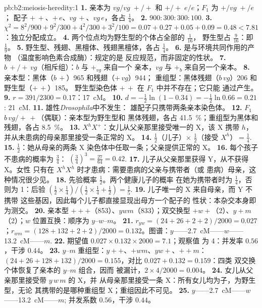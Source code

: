 \begin{solution}{pb:b2:meiosis-heredity:1}
\textbf{1.} 亲本为 $vg/vg\;+/+$ 和 $+/+\;e/e$；$F_1$ 为 $+/vg\;+/e$；
配子 $+\,+$、$+\,e$、$vg\,+$、$vg\,e$，各占 $\tfrac14$。
\textbf{2.} $900 : 300 : 300 : 100$.
\textbf{3.} $\chi^2 = 8^2/900 + 9^2/300 + 4^2/300 + 3^2/100 = 0.07 +
0.27 + 0.05 + 0.09 = 0.48 < 7.81$：独立分配成立。
\textbf{4.} 两个位点均为野生型的个体占全部的 $\tfrac{1}{16}$，
野生型占 $\tfrac{9}{16}$：即 $\tfrac19$。
\textbf{5.} 野生型、残翅、黑檀体、残翅黑檀体，各占 $\tfrac14$。
\textbf{6.} 是与环境共同作用的产物
（温度影响色素合成酶）：规定的是
反应规范，而非固定的性状。
\textbf{7.} $b\,+/+\,vg$（相斥组）：$b$ 与 $+_{vg}$ 来自一个
亲本，$vg$ 与 $+_b$ 来自另一个亲本。
\textbf{8.} 亲本型：黑体（$b\,+$）965 和残翅（$+\,vg$）944；
重组型：黑体残翅（$b\,vg$）206 和野生型（$+\,+$）185。
野生型染色体 $+\,+$ 在 $F_1$ 中并不存在；它只能
通过产生。
\textbf{9.} $r = 391/2300 = 0.17$：\qty{17}{cM}。
\textbf{10.} $d = -\tfrac12\ln(1 - 0.34) = -\tfrac12\ln 0.66 = 0.21$:
\qty{21}{cM}.
\textbf{11.} 雄性\emph{Drosophila}中不发生：
雄配子只携带两条亲本染色体。
\textbf{12.} $F_1$ $b\,vg/+\,+$（偶联）：亲本型为野生型和
黑体残翅，各占 \qty{41.5}{\%}；重组型为黑体和
残翅，各占 \qty{8.5}{\%}。
\textbf{13.} $X^hX^+$：女儿从父亲那里接受唯一的 X，该 X
携带 $h$，并从未患病的母亲那里接受一条正常的 X。
\textbf{14.} $\tfrac12$（儿子）$\times$ $\tfrac12$（接受 $X^h$）$=
\tfrac14$.
\textbf{15.} $\tfrac12$：她从母亲的两条 X
染色体中任取一条；父亲提供正常的 X。
\textbf{16.} 每个孩子不患病的概率为 $\tfrac34$：
$(\tfrac34)^3 = \tfrac{27}{64} = 0.42$.
\textbf{17.} 儿子从父亲那里获得 Y，从不获得 X。女性
只有在 $X^hX^h$ 时才患病：需要患病的父亲与携带者（或
患病）母亲，这种情况很少见。
\textbf{18.} 先验概率 $\tfrac12$。两个健康儿子的概率
在她为携带者时为 $\tfrac14$，否则为 1：后验 $(\tfrac12\times
\tfrac14)/(\tfrac12\times\tfrac14 + \tfrac12) = \tfrac15$.
\textbf{19.} 儿子唯一的 X 来自母亲，而 Y 不携带
这些基因，因此每个儿子都直接显现出母方一个配子的
性状：本杂交本身即为测交。
\textbf{20.} 亲本型 $+++$（853）、$ywm$（833）；双交换型
$+w+$（2）、$y+m$（2）；$w$ 位置互换：顺序为 $y$--$w$--$m$。
\textbf{21.} $r_{yw} = (24 + 26 + 2 + 2)/2000 = 0.027$；$r_{wm} = (128
+ 132 + 2 + 2)/2000 = 0.132$。图谱：$y$——\qty{2.7}{cM}——$w$——
\qty{13.2}{cM}——$m$.
\textbf{22.} 期望值 $0.027\times 0.132\times 2000 = 7.1$；观察值
为 4：并发率 $0.56$，干涉 $0.44$。
\textbf{23.} $y$--$m$ 重组型：$y++$、$+wm$、$yw+$、$++m$：$(24 +
26 + 128 + 132)/2000 = 0.155$，对比 $0.027 + 0.132 = 0.159$：四类
双交换个体恢复了亲本的 $y$--$m$ 组合，因而
被漏计，$2\times 4/2000 = 0.004$。
\textbf{24.} 女儿从父亲那里接受带 $y\,w\,m$ 的 X，并
从母亲那里接受一条 X：所有女儿均为子，为野生型，无论
其携带的是哪种重组型 X；重组因此不可见。
\textbf{25.} $y$——\qty{2.7}{cM}——$w$——\qty{13.2}{cM}——$m$;
并发系数 $0.56$，干涉 $0.44$。
\end{solution}
